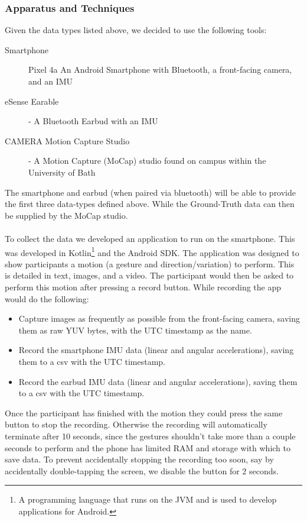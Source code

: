 \subsubsection{Apparatus and Techniques}\nl %
Given the data types listed above, we decided to use the following tools:
\begin{description}
    \item[Smartphone]\nl Pixel 4a
    An Android Smartphone with Bluetooth, a front-facing camera, and an IMU
    \item[eSense Earable] - A Bluetooth Earbud with an IMU
    \item[CAMERA Motion Capture Studio]\nl - A Motion Capture (MoCap) studio found on campus within the University of Bath
\end{description}
The smartphone and earbud (when paired via bluetooth) will be able to provide the first three data-types defined above. While the Ground-Truth data can then be supplied by the MoCap studio.
\\\\
To collect the data we developed an application to run on the smartphone. 
This was developed in Kotlin\footnote{A programming language that runs on the JVM and is used to develop applications for Android.} and the Android SDK.
The application was designed to show participants a motion (a gesture and direction/variation) to perform. This is detailed in text, images, and a video. 
The participant would then be asked to perform this motion after pressing a record button. While recording the app would do the following:
\begin{itemize}
    \item Capture images as frequently as possible from the front-facing camera, saving them as raw YUV bytes, with the UTC timestamp as the name.
    \item Record the smartphone IMU data (linear and angular accelerations), saving them to a csv with the UTC timestamp.
    \item Record the earbud IMU data (linear and angular accelerations), saving them to a csv with the UTC timestamp.
\end{itemize}
Once the participant has finished with the motion they could press the same button to stop the recording. Otherwise the recording will automatically terminate after 10 seconds, since the gestures shouldn't take more than a couple seconds to perform and the phone has limited RAM and storage with which to save data.
To prevent accidentally stopping the recording too soon, say by accidentally double-tapping the screen, we disable the button for 2 seconds.

